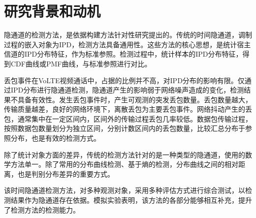 \section{研究背景和动机}
\label{chap:analyze:motivation}

隐通道的检测方法，是依据构建方法针对性研究提出的。传统的时间隐通道，调制过程的嵌入对象为IPD，检测方法具备通用性。这些方法的核心思想，是统计宿主信道的IPD分布特征，作为标准参照。检测过程中，统计样本的IPD分布特征，得到CDF曲线或PMF曲线，与标准参照进行对比。

丢包事件在VoLTE视频通话中，占据的比例并不高，对IPD分布的影响有限。仅通过IPD分布进行隐通道检测，隐通道产生的影响弱于网络噪声造成的变化，检测结果不具备有效性。发生丢包事件时，产生可观测的突发丢包数量。丢包数量越大，传输质量越差，良好的网络环境下，离散丢包为主要丢包事件。网络抖动产生的丢包，通常集中在一定区间内，区间外的传输过程丢包几率较低。数据包传输过程，按照数据包数量划分为独立区间，分别计数区间内的丢包数量，比较汇总分布于参照分布，也是有效的检测方式。

除了统计对象方面的差异，传统的检测方法针对的是一种类型的隐通道，使用的数学方法单一。除了常用的分布曲线检测、基于熵的检测，分布曲线之间的相对距离，也是判别分布差异的重要方式。

该时间隐通道检测方法，对多种观测对象，采用多种评估方式进行综合测试，以检测结果作为隐通道存在依据。模拟实验表明，该方法的各部分能够相互补充，提升了检测方法的检测能力。